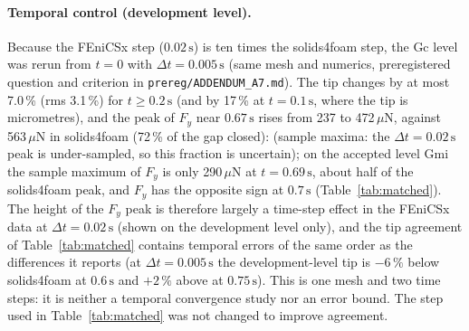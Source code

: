 \paragraph{Temporal control (development level).} Because the FEniCSx step ($0.02\,\mathrm{s}$) is ten times the solids4foam step, the Gc level was rerun from $t=0$ with $\Delta t=0.005\,\mathrm{s}$ (same mesh and numerics, preregistered question and criterion in \texttt{prereg/ADDENDUM\_A7.md}). The tip changes by at most 7.0\,\% (rms 3.1\,\%) for $t\ge0.2\,\mathrm{s}$ (and by 17\,\% at $t=0.1\,\mathrm{s}$, where the tip is micrometres), and the peak of $F_y$ near $0.67\,\mathrm{s}$ rises from 237 to 472\,$\mu$N, against 563\,$\mu$N in solids4foam (72\,\% of the gap closed): (sample maxima: the $\Delta t=0.02\,\mathrm{s}$ peak is under-sampled, so this fraction is uncertain); on the accepted level Gmi the sample maximum of $F_y$ is only 290\,$\mu$N at $t=0.69\,\mathrm{s}$, about half of the solids4foam peak, and $F_y$ has the opposite sign at $0.7\,\mathrm{s}$ (Table~\ref{tab:matched}). The height of the $F_y$ peak is therefore largely a time-step effect in the FEniCSx data at $\Delta t=0.02\,\mathrm{s}$ (shown on the development level only), and the tip agreement of Table~\ref{tab:matched} contains temporal errors of the same order as the differences it reports (at $\Delta t=0.005\,\mathrm{s}$ the development-level tip is $-6\,\%$ below solids4foam at $0.6\,\mathrm{s}$ and $+2\,\%$ above at $0.75\,\mathrm{s}$). This is one mesh and two time steps: it is neither a temporal convergence study nor an error bound. The step used in Table~\ref{tab:matched} was not changed to improve agreement.\par\begin{table}[htbp]\centering\caption{Temporal control on the development level Gc (not an accepted level) against solids4foam (ours).}\label{tab:temporal}\scriptsize\setlength{\tabcolsep}{3pt}\temporaltable\end{table}
